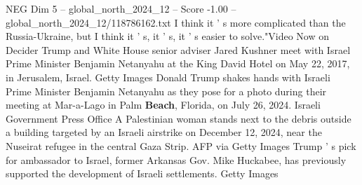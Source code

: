 \begin{textsample}{NEG Dim 5 – global\_north\_2024\_12 – Score -1.00 – global\_north\_2024\_12/118786162.txt}
I think it ' s more complicated than the Russia-Ukraine, but I think it ' s, it ' s, it ' s easier to solve."Video Now on Decider Trump and White House senior adviser Jared Kushner meet with Israel Prime Minister Benjamin Netanyahu at the King David Hotel on May 22, 2017, in Jerusalem, Israel.
Getty Images Donald Trump shakes hands with Israeli Prime Minister Benjamin Netanyahu as they pose for a photo during their meeting at Mar-a-Lago in Palm \textbf{Beach}, Florida, on July 26, 2024.
Israeli Government Press Office A Palestinian woman stands next to the debris outside a building targeted by an Israeli airstrike on December 12, 2024, near the Nuseirat refugee in the central Gaza Strip.
AFP via Getty Images Trump ' s pick for ambassador to Israel, former Arkansas Gov.
Mike Huckabee, has previously supported the development of Israeli settlements.
Getty Images

\end{textsample}
